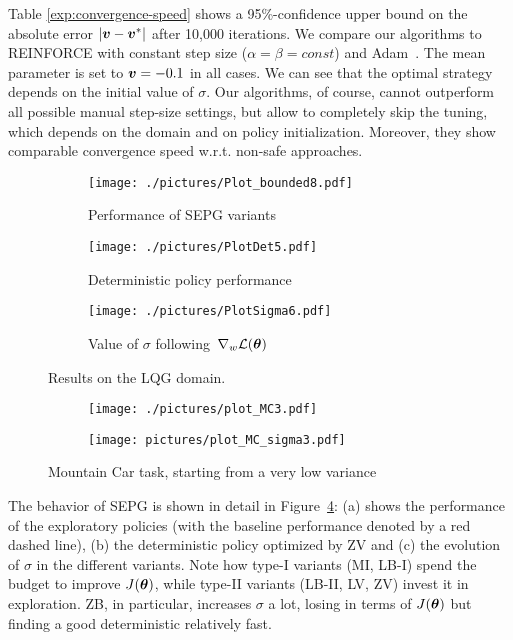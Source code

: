 Table \ref{exp:convergence-speed} shows a 95\%-confidence upper bound  on the absolute error $|\boldsymbol{v} - \boldsymbol{v}^*|$ after 10,000 iterations. We compare our algorithms to REINFORCE with constant step size ($\alpha = \beta = const$) and Adam~\cite{kingma2014adam}. The mean parameter is set to $\boldsymbol{v} = -0.1$ in all cases. We can see that the optimal strategy depends on the initial value of $\sigma$. Our algorithms, of course, cannot outperform all possible manual step-size settings, but allow to completely skip the tuning, which depends on the domain and on policy initialization. Moreover, they show comparable convergence speed w.r.t. non-safe approaches. 
\begin{figure}
\begin{subfigure}[t]{0.31\textwidth}
\texttt{[image: ./pictures/Plot\_bounded8.pdf]}
\caption{Performance of SEPG variants} \label{fig:plot_j}
\end{subfigure}\hfill
\begin{subfigure}[t]{0.33\textwidth}
\texttt{[image: ./pictures/PlotDet5.pdf]}
\caption{Deterministic policy performance}\label{fig:plot_det}
\end{subfigure}\hfill
\begin{subfigure}[t]{0.31\textwidth}
\texttt{[image: ./pictures/PlotSigma6.pdf]}
\caption{Value of $\sigma$ following~$\nabla_{w}\mathcal{L}({\boldsymbol{\theta}})$}\label{fig:plot_sigma}
\end{subfigure}
\caption{Results on the LQG domain.} 
\label{fig:perf_LQG}
\end{figure}

\begin{figure}[t]
\centering
\begin{subfigure}[t]{0.31\textwidth}
\texttt{[image: ./pictures/plot\_MC3.pdf]}
\end{subfigure}
\begin{subfigure}[t]{0.31\textwidth}
\texttt{[image: pictures/plot\_MC\_sigma3.pdf]}
\end{subfigure}
\caption{Mountain Car task, starting from a very low variance}
\end{figure}\label{fig:mc}
The behavior of SEPG is shown in detail in Figure~\ref{fig:perf_LQG}: (a) shows the performance of the exploratory policies (with the baseline performance denoted by a red dashed line), (b) the deterministic policy optimized by ZV and (c) the evolution of $\sigma$ in the different variants. Note how type-I variants (MI, LB-I) spend the budget to improve $J({\boldsymbol{\theta}})$, while type-II variants (LB-II, LV, ZV) invest it in exploration. ZB, in particular, increases $\sigma$ a lot, losing in terms of $J({\boldsymbol{\theta}})$ but finding a good deterministic relatively fast.

